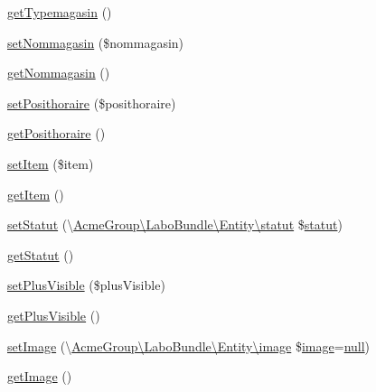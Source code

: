 \begin{DoxyCompactItemize}
\hyperlink{class_acme_group_1_1_labo_bundle_1_1_entity_1_1magasin_abe93f696122da2e02b88d48833acb286}{get\+Typemagasin} ()
\item 
\hyperlink{class_acme_group_1_1_labo_bundle_1_1_entity_1_1magasin_a0b5679304f32859bcbab835ba25a3279}{set\+Nommagasin} (\$nommagasin)
\item 
\hyperlink{class_acme_group_1_1_labo_bundle_1_1_entity_1_1magasin_ad7c86b8b2bd36e0f2477fccb97adc866}{get\+Nommagasin} ()
\item 
\hyperlink{class_acme_group_1_1_labo_bundle_1_1_entity_1_1magasin_a3e096994b374e5a6793219879b7d8ace}{set\+Posithoraire} (\$posithoraire)
\item 
\hyperlink{class_acme_group_1_1_labo_bundle_1_1_entity_1_1magasin_a4f4295514a0f3ecbddf64d8be60a1b7d}{get\+Posithoraire} ()
\item 
\hyperlink{class_acme_group_1_1_labo_bundle_1_1_entity_1_1magasin_a7bb008b7e5a6dc26c9f55b9f78b723d1}{set\+Item} (\$item)
\item 
\hyperlink{class_acme_group_1_1_labo_bundle_1_1_entity_1_1magasin_a923d5238f673ed5d3835120ce7302ac9}{get\+Item} ()
\item 
\hyperlink{class_acme_group_1_1_labo_bundle_1_1_entity_1_1magasin_a1f933982f9bac9770025979ec1f11017}{set\+Statut} (\textbackslash{}\hyperlink{class_acme_group_1_1_labo_bundle_1_1_entity_1_1statut}{Acme\+Group\textbackslash{}\+Labo\+Bundle\textbackslash{}\+Entity\textbackslash{}statut} \$\hyperlink{class_acme_group_1_1_labo_bundle_1_1_entity_1_1statut}{statut})
\item 
\hyperlink{class_acme_group_1_1_labo_bundle_1_1_entity_1_1magasin_add0a85480784d56975b445bbc860d321}{get\+Statut} ()
\item 
\hyperlink{class_acme_group_1_1_labo_bundle_1_1_entity_1_1magasin_ab34384e07d7347d7684bae2a6b068e06}{set\+Plus\+Visible} (\$plus\+Visible)
\item 
\hyperlink{class_acme_group_1_1_labo_bundle_1_1_entity_1_1magasin_a81b36515011b079cabaf4fd7d4cfcee0}{get\+Plus\+Visible} ()
\item 
\hyperlink{class_acme_group_1_1_labo_bundle_1_1_entity_1_1magasin_a93a0f2cc082f3e348150e17df14bef04}{set\+Image} (\textbackslash{}\hyperlink{class_acme_group_1_1_labo_bundle_1_1_entity_1_1image}{Acme\+Group\textbackslash{}\+Labo\+Bundle\textbackslash{}\+Entity\textbackslash{}image} \$\hyperlink{class_acme_group_1_1_labo_bundle_1_1_entity_1_1image}{image}=\hyperlink{validate_8js_afb8e110345c45e74478894341ab6b28e}{null})
\item 
\hyperlink{class_acme_group_1_1_labo_bundle_1_1_entity_1_1magasin_aad91a3053df37faf23da52e8611960c9}{get\+Image} ()
\end{DoxyCompactItemize}


